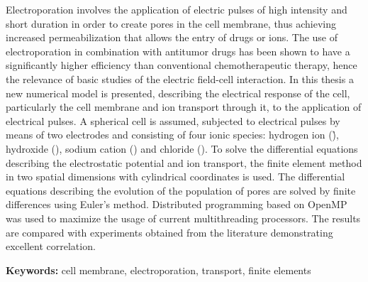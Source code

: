 Electroporation involves the application of electric pulses of high intensity and short duration in order to create pores in the cell membrane, thus achieving increased permeabilization that allows the entry of drugs or ions.
The use of electroporation in combination with antitumor drugs has been shown to have a significantly higher efficiency than conventional chemotherapeutic therapy, hence the relevance of basic studies of the electric field-cell interaction.
In this thesis a new numerical model is presented, describing the electrical response of the cell, particularly the cell membrane and ion transport through it, to the application of electrical pulses.
A spherical cell is assumed, subjected to electrical pulses by means of two electrodes and consisting of four ionic species: hydrogen ion (\h), hydroxide (\oh), sodium cation (\na) and chloride (\cl).
To solve the differential equations describing the electrostatic potential and ion transport, the finite element method in two spatial dimensions with cylindrical coordinates is used.
The differential equations describing the evolution of the population of pores are solved by finite differences using Euler's method.
Distributed programming based on OpenMP was used to maximize the usage of current multithreading processors.
The results are compared with experiments obtained from the literature demonstrating excellent correlation.

\bigskip

\noindent\textbf{Keywords:} cell membrane, electroporation, transport, finite elements